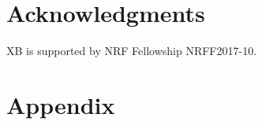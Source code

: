 \documentclass[letterpaper]{article} %
\begin{document}






\section*{Acknowledgments}
XB is supported by NRF Fellowship NRFF2017-10.



\newpage
\appendix
\section{Appendix}
\end{document}
